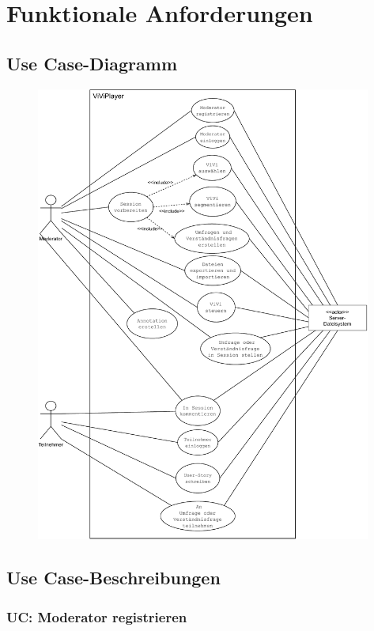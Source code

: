 \section{Funktionale Anforderungen}

\subsection{Use Case-Diagramm}
\begin{figure}[h!]
	\centering
	\includegraphics[width=0.98275\textwidth]{sections/diagrams/viviplyer-uc-diagramm.pdf}
\end{figure}
\pagebreak

\subsection{Use Case-Beschreibungen}

\subsubsection{UC: Moderator registrieren}

\pagebreak

